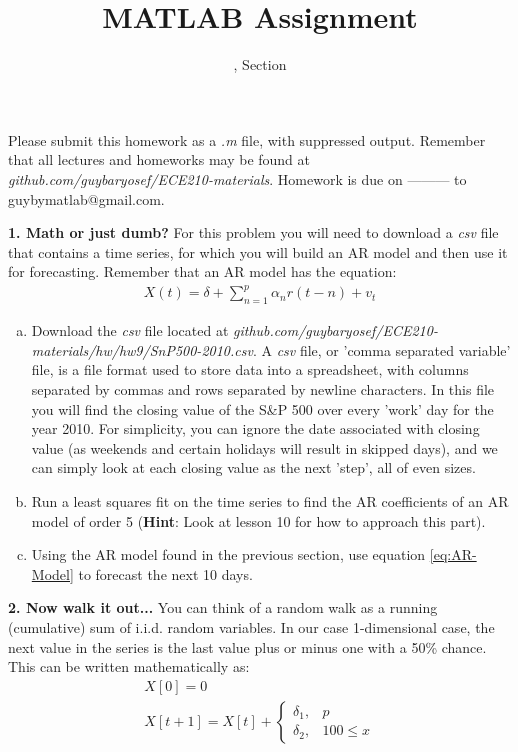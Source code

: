 \documentclass[11pt]{article}
\title{MATLAB Assignment \Homework}
\author{\Session, Section \Section}
\date{}
\makeatletter
\def\MyEmail{guybymatlab@gmail.com}
\def\DateOfSubmission{ --------- }
\makeatother
\begin{document}
\maketitle
Please submit this homework as a \textit{.m} file, 
with suppressed output.
Remember that all lectures and homeworks may be found at 
\textit{github.com/guybaryosef/ECE210-materials}.
Homework is due on \DateOfSubmission to \MyEmail.

\noindent
\newline
\textbf{1. Math or just dumb?}
For this problem you will need to download a \textit{csv} file that
contains a time series, for which you will build an AR model and then
use it for forecasting. Remember that an AR model has the equation:
\begin{eqnarray}\label{eq:AR-Model}
    X(t) = \delta + \sum_{n = 1}^{p}\alpha_nr(t-n) + v_t
\end{eqnarray}

\begin{enumerate}[a.]
    \item Download the \textit{csv} file located at 
    \textit{github.com/guybaryosef/ECE210-materials/hw/hw9/SnP500-2010.csv}.
    A \textit{csv} file, or 'comma separated variable' file,
    is a file format used to store data into a spreadsheet, 
    with columns separated by commas and rows separated by 
    newline characters.
    In this file you will find the closing value of the S\&P 500 over every
    'work' day for the year 2010.
    For simplicity, you can ignore the date associated with closing value
    (as weekends and certain holidays will result in skipped days), and we 
    can simply look at each closing value as the next 'step', all of even sizes.

    \item Run a least squares fit on the time series to find the AR
    coefficients of an AR model of order 5 (\textbf{Hint}: Look at lesson
    10 for how to approach this part).

    \item Using the AR model found in the previous section, use equation
    \eqref{eq:AR-Model} to forecast the next 10 days.
\end{enumerate}

\noindent
\newline
\textbf{2. Now walk it out...}
You can think of a random walk as a running (cumulative) sum of
i.i.d. random variables. In our case 1-dimensional case,
the next value in the series is the last value plus or minus one with a 50\%
chance. This can be written mathematically as:
\begin{eqnarray*}
    X[0] = 0 \\
    X[t+1] = X[t] + \begin{cases} 
            \delta_1, & p \\
            \delta_2, & 100\leq x 
        \end{cases}
\end{eqnarray*}
    
\end{document}
